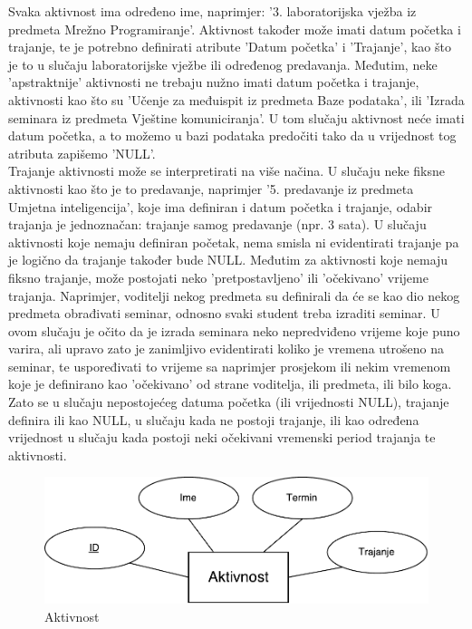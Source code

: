 \documentclass[times, utf8, zavrsni]{fer}
\begin{document}
Svaka aktivnost ima određeno ime, naprimjer: '3. laboratorijska vježba iz predmeta Mrežno Programiranje'. Aktivnost također može imati datum početka i trajanje, te je potrebno definirati atribute 'Datum početka' i 'Trajanje', kao što je to u slučaju laboratorijske vježbe ili određenog predavanja. Međutim, neke 'apstraktnije' aktivnosti ne trebaju nužno imati datum početka i trajanje, aktivnosti kao što su 'Učenje za međuispit iz predmeta Baze podataka', ili 'Izrada seminara iz predmeta Vještine komuniciranja'. U tom slučaju aktivnost neće imati datum početka, a to možemo u bazi podataka predočiti tako da u vrijednost tog atributa zapišemo 'NULL'.\\

Trajanje aktivnosti može se interpretirati na više načina. U slučaju neke fiksne aktivnosti kao što je to predavanje, naprimjer '5. predavanje iz predmeta Umjetna inteligencija', koje ima definiran i datum početka i trajanje, odabir trajanja je jednoznačan: trajanje samog predavanje (npr. 3 sata). U slučaju aktivnosti koje nemaju definiran početak, nema smisla ni evidentirati trajanje pa je logično da trajanje također bude NULL. Međutim za aktivnosti koje nemaju fiksno trajanje, može postojati neko 'pretpostavljeno' ili 'očekivano' vrijeme trajanja. Naprimjer, voditelji nekog predmeta su definirali da će se kao dio nekog predmeta obrađivati seminar, odnosno svaki student treba izraditi seminar. U ovom slučaju je očito da je izrada seminara neko nepredviđeno vrijeme koje puno varira, ali upravo zato je zanimljivo evidentirati koliko je vremena utrošeno na seminar, te uspoređivati to vrijeme sa naprimjer prosjekom ili nekim vremenom koje je definirano kao 'očekivano' od strane voditelja, ili predmeta, ili bilo koga. Zato se u slučaju nepostojećeg datuma početka (ili vrijednosti NULL), trajanje definira ili kao NULL, u slučaju kada ne postoji trajanje, ili kao određena vrijednost u slučaju kada postoji neki očekivani vremenski period trajanja te aktivnosti.\\

\begin{figure}[H]
\centering
\includegraphics[width=\textwidth,height=\textheight,keepaspectratio]{img/aktivnost.pdf}
\caption{Aktivnost}
\label{fig:aktivnost}
\end{figure}
\end{document}
